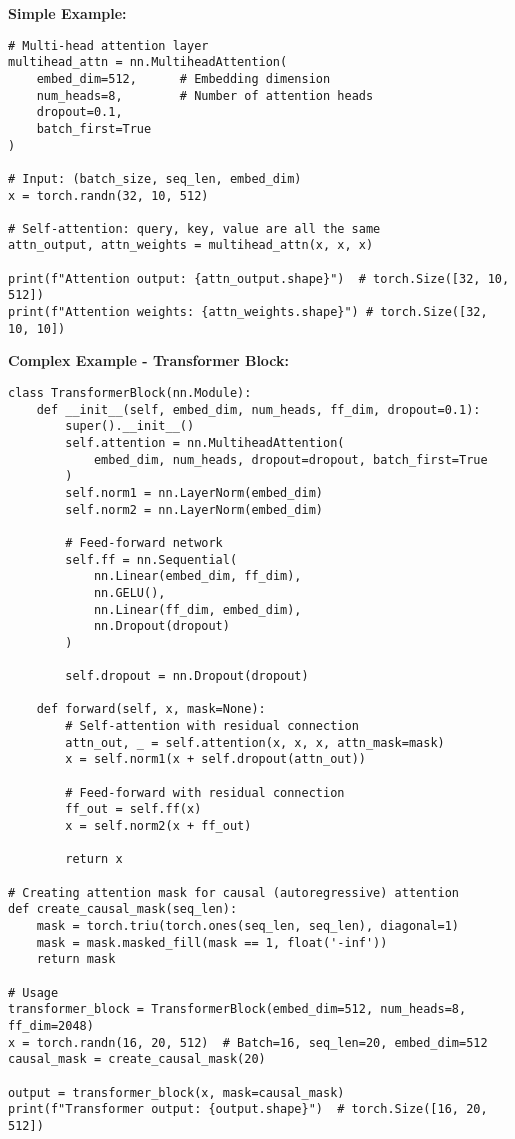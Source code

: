 \documentclass[11pt,a4paper]{book}
\begin{document}
\textbf{Simple Example:}
\begin{verbatim}
# Multi-head attention layer
multihead_attn = nn.MultiheadAttention(
    embed_dim=512,      # Embedding dimension
    num_heads=8,        # Number of attention heads
    dropout=0.1,
    batch_first=True
)

# Input: (batch_size, seq_len, embed_dim)
x = torch.randn(32, 10, 512)

# Self-attention: query, key, value are all the same
attn_output, attn_weights = multihead_attn(x, x, x)

print(f"Attention output: {attn_output.shape}")  # torch.Size([32, 10, 512])
print(f"Attention weights: {attn_weights.shape}") # torch.Size([32, 10, 10])
\end{verbatim}

\textbf{Complex Example - Transformer Block:}
\begin{verbatim}
class TransformerBlock(nn.Module):
    def __init__(self, embed_dim, num_heads, ff_dim, dropout=0.1):
        super().__init__()
        self.attention = nn.MultiheadAttention(
            embed_dim, num_heads, dropout=dropout, batch_first=True
        )
        self.norm1 = nn.LayerNorm(embed_dim)
        self.norm2 = nn.LayerNorm(embed_dim)
        
        # Feed-forward network
        self.ff = nn.Sequential(
            nn.Linear(embed_dim, ff_dim),
            nn.GELU(),
            nn.Linear(ff_dim, embed_dim),
            nn.Dropout(dropout)
        )
        
        self.dropout = nn.Dropout(dropout)
    
    def forward(self, x, mask=None):
        # Self-attention with residual connection
        attn_out, _ = self.attention(x, x, x, attn_mask=mask)
        x = self.norm1(x + self.dropout(attn_out))
        
        # Feed-forward with residual connection
        ff_out = self.ff(x)
        x = self.norm2(x + ff_out)
        
        return x

# Creating attention mask for causal (autoregressive) attention
def create_causal_mask(seq_len):
    mask = torch.triu(torch.ones(seq_len, seq_len), diagonal=1)
    mask = mask.masked_fill(mask == 1, float('-inf'))
    return mask

# Usage
transformer_block = TransformerBlock(embed_dim=512, num_heads=8, ff_dim=2048)
x = torch.randn(16, 20, 512)  # Batch=16, seq_len=20, embed_dim=512
causal_mask = create_causal_mask(20)

output = transformer_block(x, mask=causal_mask)
print(f"Transformer output: {output.shape}")  # torch.Size([16, 20, 512])
\end{verbatim}
\end{document}
